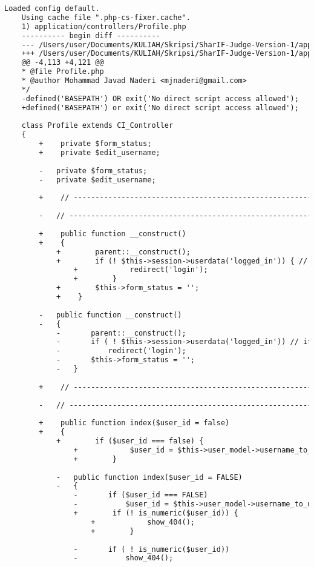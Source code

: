 \begin{lstlisting}[language=diff, caption=Perubahan pada kode Profile.php]
	Loaded config default.
	Using cache file ".php-cs-fixer.cache".
	1) application/controllers/Profile.php
	---------- begin diff ----------
	--- /Users/user/Documents/KULIAH/Skripsi/SharIF-Judge-Version-1/application/controllers/Profile.php
	+++ /Users/user/Documents/KULIAH/Skripsi/SharIF-Judge-Version-1/application/controllers/Profile.php
	@@ -4,113 +4,121 @@
	* @file Profile.php
	* @author Mohammad Javad Naderi <mjnaderi@gmail.com>
	*/
	-defined('BASEPATH') OR exit('No direct script access allowed');
	+defined('BASEPATH') or exit('No direct script access allowed');
	
	class Profile extends CI_Controller
	{
		+    private $form_status;
		+    private $edit_username;
		
		-	private $form_status;
		-	private $edit_username;
		
		+    // ------------------------------------------------------------------------
		
		-	// ------------------------------------------------------------------------
		
		+    public function __construct()
		+    {
			+        parent::__construct();
			+        if (! $this->session->userdata('logged_in')) { // if not logged in
				+            redirect('login');
				+        }
			+        $this->form_status = '';
			+    }
		
		-	public function __construct()
		-	{
			-		parent::__construct();
			-		if ( ! $this->session->userdata('logged_in')) // if not logged in
			-			redirect('login');
			-		$this->form_status = '';
			-	}
		
		+    // ------------------------------------------------------------------------
		
		-	// ------------------------------------------------------------------------
		
		+    public function index($user_id = false)
		+    {
			+        if ($user_id === false) {
				+            $user_id = $this->user_model->username_to_user_id($this->user->username);
				+        }
			
			-	public function index($user_id = FALSE)
			-	{
				-		if ($user_id === FALSE)
				-			$user_id = $this->user_model->username_to_user_id($this->user->username);
				+        if (! is_numeric($user_id)) {
					+            show_404();
					+        }
				
				-		if ( ! is_numeric($user_id))
				-			show_404();
				

\end{lstlisting}
